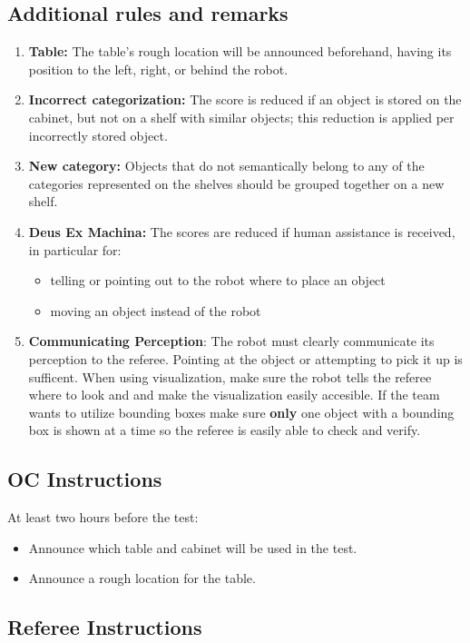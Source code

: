 \subsection*{Additional rules and remarks}
\begin{enumerate}
	\item \textbf{Table:} The table's rough location will be announced beforehand, having its position to the left, right, or behind the robot.
	\item \textbf{Incorrect categorization:} The score is reduced if an object is stored on the cabinet, but not on a shelf with similar objects; this reduction is applied per incorrectly stored object.
	\item \textbf{New category:} Objects that do not semantically belong to any of the categories represented on the shelves should be grouped together on a new shelf.
	\item \textbf{Deus Ex Machina:} The scores are reduced if human assistance is received, in particular for:
	\begin{itemize}
		\item telling or pointing out to the robot where to place an object
		\item moving an object instead of the robot
	\end{itemize}
	\item \textbf{Communicating Perception}: The robot must clearly communicate its perception to the referee.
	Pointing at the object or attempting to pick it up is sufficent. When using visualization, make sure the robot 
	tells the referee where to look and and make the visualization easily accesible. 
	If the team wants to utilize bounding boxes make sure \textbf{only} one object with a bounding box is shown 
	at a time so the referee is easily able to check and verify.
\end{enumerate}

\subsection*{OC Instructions}

At least two hours before the test:
\begin{itemize}
	\item Announce which table and cabinet will be used in the test.
	\item Announce a rough location for the table.
\end{itemize}

\subsection*{Referee Instructions}

